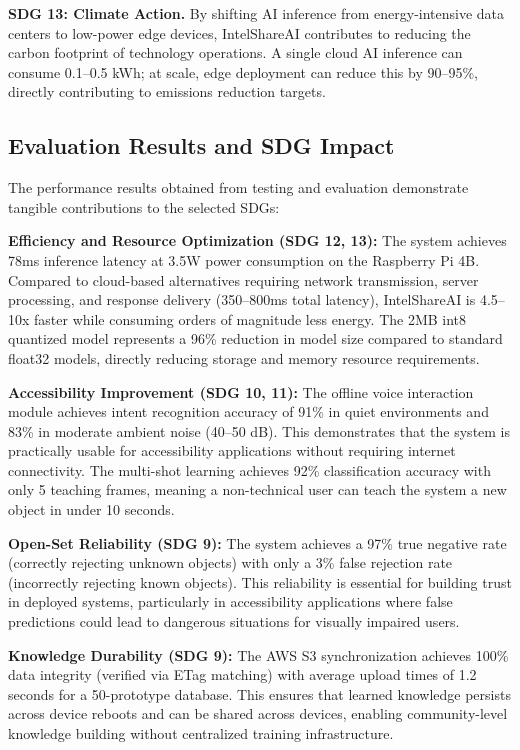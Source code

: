 \documentclass[12pt,a4paper]{report}
\begin{document}
\textbf{SDG 13: Climate Action.} By shifting AI inference from energy-intensive data centers to low-power edge devices, IntelShareAI contributes to reducing the carbon footprint of technology operations. A single cloud AI inference can consume 0.1--0.5 kWh; at scale, edge deployment can reduce this by 90--95\%, directly contributing to emissions reduction targets.

\subsection{Evaluation Results and SDG Impact}
The performance results obtained from testing and evaluation demonstrate tangible contributions to the selected SDGs:

\textbf{Efficiency and Resource Optimization (SDG 12, 13):} The system achieves 78ms inference latency at 3.5W power consumption on the Raspberry Pi 4B. Compared to cloud-based alternatives requiring network transmission, server processing, and response delivery (350--800ms total latency), IntelShareAI is 4.5--10x faster while consuming orders of magnitude less energy. The 2MB int8 quantized model represents a 96\% reduction in model size compared to standard float32 models, directly reducing storage and memory resource requirements.

\textbf{Accessibility Improvement (SDG 10, 11):} The offline voice interaction module achieves intent recognition accuracy of 91\% in quiet environments and 83\% in moderate ambient noise (40--50 dB). This demonstrates that the system is practically usable for accessibility applications without requiring internet connectivity. The multi-shot learning achieves 92\% classification accuracy with only 5 teaching frames, meaning a non-technical user can teach the system a new object in under 10 seconds.

\textbf{Open-Set Reliability (SDG 9):} The system achieves a 97\% true negative rate (correctly rejecting unknown objects) with only a 3\% false rejection rate (incorrectly rejecting known objects). This reliability is essential for building trust in deployed systems, particularly in accessibility applications where false predictions could lead to dangerous situations for visually impaired users.

\textbf{Knowledge Durability (SDG 9):} The AWS S3 synchronization achieves 100\% data integrity (verified via ETag matching) with average upload times of 1.2 seconds for a 50-prototype database. This ensures that learned knowledge persists across device reboots and can be shared across devices, enabling community-level knowledge building without centralized training infrastructure.
\end{document}
